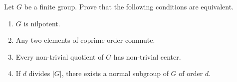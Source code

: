 \begin{prob}
\label{xca:nilpotente_equivalencia}
	Let $G$ be a finite group. Prove that the following conditions are equivalent.
	\begin{enumerate}
		\item $G$ is nilpotent.
		\item Any two elements of coprime order commute. 
		\item Every non-trivial quotient of $G$ has non-trivial center.
		\item If $d$ divides $|G|$, there exists a normal subgroup of $G$ of order $d$. 
		\end{enumerate}
\end{prob}



